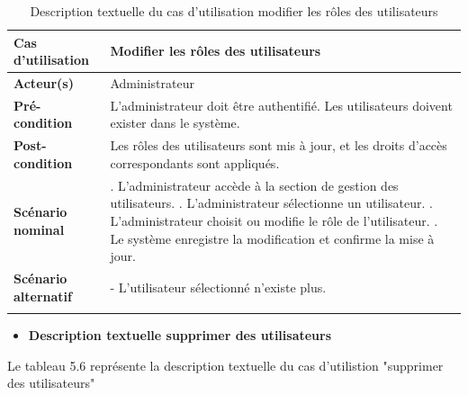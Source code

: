 \begin{longtable}{|>{\raggedright\arraybackslash}p{4cm}|>{\raggedright\arraybackslash}p{11cm}|}
\hline
\textbf{Cas d’utilisation} & Modifier les rôles des utilisateurs \\
\hline
\textbf{Acteur(s)} & Administrateur \\
\hline
\textbf{Pré-condition} & L’administrateur doit être authentifié. \newline Les utilisateurs doivent exister dans le système. \\
\hline
\textbf{Post-condition} & Les rôles des utilisateurs sont mis à jour, et les droits d’accès correspondants sont appliqués. \\
\hline
\textbf{Scénario nominal} &
1. L’administrateur accède à la section de gestion des utilisateurs. \newline
2. L’administrateur sélectionne un utilisateur. \newline
3. L’administrateur choisit ou modifie le rôle de l’utilisateur. \newline
4. Le système enregistre la modification et confirme la mise à jour. \\
\hline
\textbf{Scénario alternatif} &
- L’utilisateur sélectionné n’existe plus. \newline
\\
\hline

\captionsetup{justification=centering}
\caption{Description textuelle du cas d’utilisation modifier les rôles des utilisateurs}
\label{tab:DescriptionRolesUtilisateurs}
\end{longtable}

\begin{itemize}[label=\textbullet]
    \item \textbf{Description textuelle supprimer des utilisateurs }
\end{itemize}

Le tableau 5.6 représente la description textuelle du cas d'utilistion "supprimer des utilisateurs"

